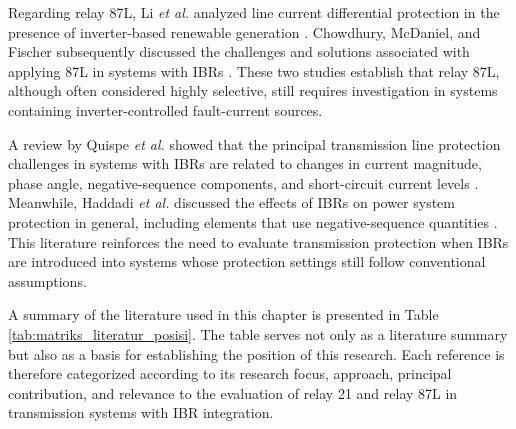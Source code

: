 Regarding relay 87L, Li \textit{et al.} analyzed line current differential protection in the presence of inverter-based renewable generation \cite{li2017analysis}. Chowdhury, McDaniel, and Fischer subsequently discussed the challenges and solutions associated with applying 87L in systems with IBRs \cite{chowdhury2023lcd}. These two studies establish that relay 87L, although often considered highly selective, still requires investigation in systems containing inverter-controlled fault-current sources.

A review by Quispe \textit{et al.} showed that the principal transmission line protection challenges in systems with IBRs are related to changes in current magnitude, phase angle, negative-sequence components, and short-circuit current levels \cite{quispe2022transmission_review}. Meanwhile, Haddadi \textit{et al.} discussed the effects of IBRs on power system protection in general, including elements that use negative-sequence quantities \cite{haddadi2021systemprotection,haddadi2021negative_sequence_elements}. This literature reinforces the need to evaluate transmission protection when IBRs are introduced into systems whose protection settings still follow conventional assumptions.

A summary of the literature used in this chapter is presented in Table \ref{tab:matriks_literatur_posisi}. The table serves not only as a literature summary but also as a basis for establishing the position of this research. Each reference is therefore categorized according to its research focus, approach, principal contribution, and relevance to the evaluation of relay 21 and relay 87L in transmission systems with IBR integration.

